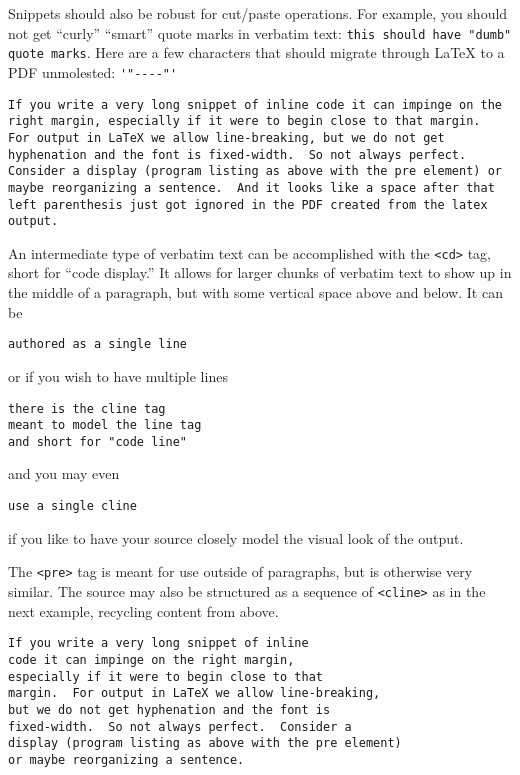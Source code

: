 \documentclass[10pt,]{article}
\theoremstyle{plain}
\theoremstyle{definition}
\theoremstyle{definition}
\theoremstyle{definition}
\theoremstyle{definition}
\theoremstyle{definition}
\theoremstyle{definition}
\numberwithin{equation}{section}
\begin{document}
\par
\hypertarget{p-615}{}%
Snippets should also be robust for cut/paste operations.  For example, you should not get ``curly'' ``smart'' quote marks in verbatim text: \lstinline?this should have "dumb" quote marks?. Here are a few characters that should migrate through \LaTeX{} to a PDF unmolested:  \lstinline?'"----"'?%
\par
\hypertarget{p-616}{}%
\lstinline?If you write a very long snippet of inline code it can impinge on the right margin, especially if it were to begin close to that margin.  For output in LaTeX we allow line-breaking, but we do not get hyphenation and the font is fixed-width.  So not always perfect.  Consider a display (program listing as above with the pre element) or maybe reorganizing a sentence.  And it looks like a space after that left parenthesis just got ignored in the PDF created from the latex output.?%
\par
\hypertarget{p-617}{}%
An intermediate type of verbatim text can be accomplished with the \lstinline?<cd>? tag, short for ``code display.''  It allows for larger chunks of verbatim text to show up in the middle of a paragraph, but with some vertical space above and below.  It can be%
\begin{verbatim}
authored as a single line
\end{verbatim}
or if you wish to have multiple lines%
\begin{verbatim}
there is the cline tag
meant to model the line tag
and short for "code line"
\end{verbatim}
and you may even%
\begin{verbatim}
use a single cline
\end{verbatim}
if you like to have your source closely model the visual look of the output.%
\par
\hypertarget{p-618}{}%
The \lstinline?<pre>? tag is meant for use outside of paragraphs, but is otherwise very similar.  The source may also be structured as a sequence of \lstinline?<cline>? as in the next example, recycling content from above.%
\begin{verbatim}
If you write a very long snippet of inline 
code it can impinge on the right margin,
especially if it were to begin close to that
margin.  For output in LaTeX we allow line-breaking,
but we do not get hyphenation and the font is
fixed-width.  So not always perfect.  Consider a
display (program listing as above with the pre element)
or maybe reorganizing a sentence.
\end{verbatim}
\typeout{************************************************}
\typeout{************************************************}
\end{document}
